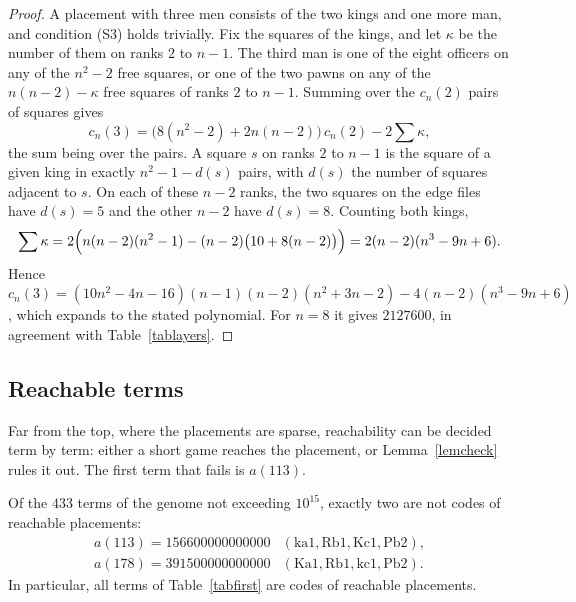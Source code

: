 \documentclass[12pt,reqno]{article}
\newcommand{\sq}[1]{\mathrm{#1}}
\begin{document}
\begin{proof}
A placement with three men consists of the two kings and one more man, and condition (S3)
holds trivially. Fix the squares of the kings, and let $\kappa$ be the number of them on ranks $2$
to $n-1$. The third man is one of the eight officers on any of the $n^2-2$ free squares, or one of
the two pawns on any of the $n(n-2)-\kappa$ free squares of ranks $2$ to $n-1$. Summing over the
$c_n(2)$ pairs of squares gives
\begin{displaymath}
c_n(3)=\bigl(8(n^2-2)+2n(n-2)\bigr)\,c_n(2)-2\sum\kappa ,
\end{displaymath}
the sum being over the pairs. A square $s$ on ranks $2$ to $n-1$ is the square of a given king in
exactly $n^2-1-d(s)$ pairs, with $d(s)$ the number of squares adjacent to $s$. On each of these
$n-2$ ranks, the two squares on the edge files have $d(s)=5$ and the other $n-2$ have $d(s)=8$.
Counting both kings,
\begin{displaymath}
\sum\kappa=2\Bigl(n(n-2)(n^2-1)-(n-2)\bigl(10+8(n-2)\bigr)\Bigr)=2(n-2)(n^3-9n+6).
\end{displaymath}
Hence $c_n(3)=(10n^2-4n-16)(n-1)(n-2)(n^2+3n-2)-4(n-2)(n^3-9n+6)$, which expands to
the stated polynomial. For $n=8$ it gives $2127600$, in agreement with Table~\ref{tablayers}.
\end{proof}

\subsection{Reachable terms}

Far from the top, where the placements are sparse, reachability can be decided term by term:
either a short game reaches the placement, or Lemma~\ref{lemcheck} rules it out. The first
term that fails is $a(113)$.

\begin{proposition}\label{propreach}
Of the $433$ terms of the genome not exceeding $10^{15}$, exactly two are not codes of reachable
placements:
\begin{displaymath}
\begin{array}{ll}
a(113)=156600000000000 & (\sq{ka1},\sq{Rb1},\sq{Kc1},\sq{Pb2}),\\
a(178)=391500000000000 & (\sq{Ka1},\sq{Rb1},\sq{kc1},\sq{Pb2}).
\end{array}
\end{displaymath}
In particular, all terms of Table~\ref{tabfirst} are codes of reachable placements.
\end{proposition}
\end{document}

